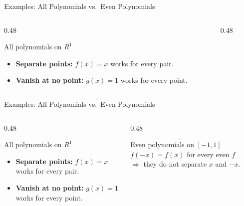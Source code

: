 \documentclass[aspectratio=169,12pt,t]{beamer}
\begin{document}
{%
\begin{frame}{Examples: All Polynomials vs.\ Even Polynomials}
  \begin{columns}[T]
    \begin{column}{0.48\textwidth}
      \begin{exblock}{All polynomials on $R^1$}
        \begin{itemize}
          \item \textbf{Separate points:} $f(x) = x$ works for every pair.
          \item \textbf{Vanish at no point:} $g(x) = 1$ works for every point.
        \end{itemize}
      \end{exblock}
    \end{column}
    \begin{column}{0.48\textwidth}

    \end{column}
  \end{columns}

\end{frame}

\begin{frame}{Examples: All Polynomials vs.\ Even Polynomials}
  \begin{columns}[T]
    \begin{column}{0.48\textwidth}
      \begin{exblock}{All polynomials on $R^1$}
        \begin{itemize}
          \item \textbf{Separate points:} $f(x) = x$ works for every pair.
          \item \textbf{Vanish at no point:} $g(x) = 1$ works for every point.
        \end{itemize}
      \end{exblock}
    \end{column}
    \begin{column}{0.48\textwidth}
      \begin{exblock}{Even polynomials on $[-1,1]$}
        $f(-x) = f(x)$ for every even $f$\\
        $\Longrightarrow$ they do \alert{not} separate $x$ and $-x$.


\end{exblock}
\end{column}
\end{columns}
\end{frame}}
\end{document}
